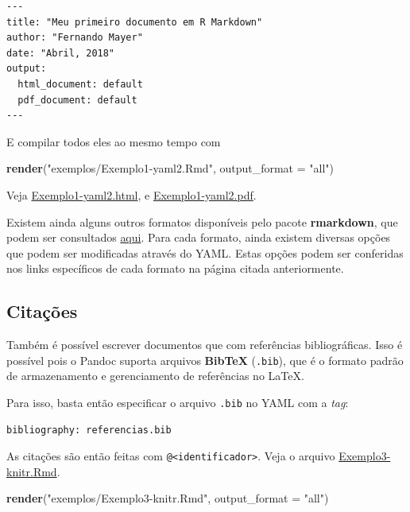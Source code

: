 \documentclass[10pt,a4paper]{book}
\newenvironment{Shaded}{\begin{snugshade}}{\end{snugshade}}
\newcommand{\KeywordTok}[1]{\textcolor[rgb]{0.13,0.29,0.53}{\textbf{#1}}}
\newcommand{\DataTypeTok}[1]{\textcolor[rgb]{0.13,0.29,0.53}{#1}}
\newcommand{\StringTok}[1]{\textcolor[rgb]{0.31,0.60,0.02}{#1}}
\newcommand{\NormalTok}[1]{#1}
\begin{document}
\begin{verbatim}
---
title: "Meu primeiro documento em R Markdown"
author: "Fernando Mayer"
date: "Abril, 2018"
output:
  html_document: default
  pdf_document: default
---
\end{verbatim}

E compilar todos eles ao mesmo tempo com

\begin{Shaded}
\begin{Highlighting}[]
\KeywordTok{render}\NormalTok{(}\StringTok{"exemplos/Exemplo1-yaml2.Rmd"}\NormalTok{, }\DataTypeTok{output_format =} \StringTok{"all"}\NormalTok{)}
\end{Highlighting}
\end{Shaded}

Veja \href{exemplos/Exemplo1-yaml2.html}{Exemplo1-yaml2.html}, e
\href{exemplos/Exemplo1-yaml2.pdf}{Exemplo1-yaml2.pdf}.

Existem ainda alguns outros formatos disponíveis pelo pacote
\textbf{rmarkdown}, que podem ser consultados
\href{https://rmarkdown.rstudio.com/formats.html}{aqui}. Para cada
formato, ainda existem diversas opções que podem ser modificadas através
do YAML. Estas opções podem ser conferidas nos links específicos de cada
formato na página citada anteriormente.

\subsection{Citações}\label{citauxe7uxf5es}

Também é possível escrever documentos que com referências
bibliográficas. Isso é possível pois o Pandoc suporta arquivos
\textbf{BibTeX} (\texttt{.bib}), que é o formato padrão de armazenamento
e gerenciamento de referências no LaTeX.

Para isso, basta então especificar o arquivo \texttt{.bib} no YAML com a
\emph{tag}:

\begin{verbatim}
bibliography: referencias.bib
\end{verbatim}

As citações são então feitas com
\texttt{@\textless{}identificador\textgreater{}}. Veja o arquivo
\href{exemplos/Exemplo3-knitr.Rmd}{Exemplo3-knitr.Rmd}.

\begin{Shaded}
\begin{Highlighting}[]
\KeywordTok{render}\NormalTok{(}\StringTok{"exemplos/Exemplo3-knitr.Rmd"}\NormalTok{, }\DataTypeTok{output_format =} \StringTok{"all"}\NormalTok{)}
\end{Highlighting}
\end{Shaded}
\end{document}
